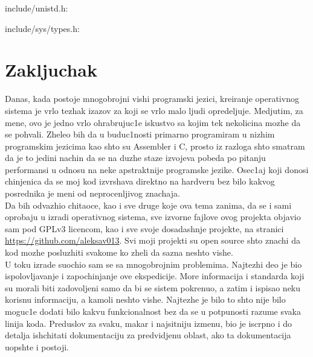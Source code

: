 \documentclass[a4paper,fleqn,12pt]{JMThesis}
\newcommand\eng{\fontencoding{OT1}\fontfamily{\rmdefault}\selectfont}
\newcommand\srb{\fontencoding{OT2}\fontfamily{\rmdefault}\selectfont}
\begin{document}
{\eng include/unistd.h}:

\medskip\begin{minipage}{\textwidth}\eng\srb\end{minipage}\smallskip

{\eng include/sys/types.h}:

\medskip\begin{minipage}{\textwidth}\eng\srb\end{minipage}\smallskip



\chapter{Zakljuchak}

Danas, kada postoje mnogobrojni vishi programski jezici, kreiranje operativnog
sistema je vrlo tezhak izazov za koji se vrlo malo ljudi opredeljuje. Medjutim,
za mene, ovo je jedno vrlo ohrabrujuc1e iskustvo sa kojim tek nekolicina mozhe
da se pohvali. Zheleo bih da u buduc1nosti primarno programiram u nizhim
programskim jezicima kao shto su {\eng Assembler} i {\eng C}, prosto iz razloga
shto smatram da je to jedini nachin da se na duzhe staze izvojeva pobeda po
pitanju performansi u odnosu na neke apstraktnije programske jezike. Osec1aj
koji donosi chinjenica da se moj kod izvrshava direktno na hardveru bez bilo
kakvog posrednika je meni od neprocenljivog znachaja.\\

Da bih odvazhio chitaoce, kao i sve druge koje ova tema zanima, da se i sami
oprobaju u izradi operativnog sistema, sve izvorne fajlove ovog projekta
objavio sam pod {\eng GPLv3} licencom, kao i sve svoje dosadashnje projekte, na
stranici {\eng\url{https://github.com/aleksav013}}. Svi moji projekti su {\eng
open source} shto znachi da kod mozhe posluzhiti svakome ko zheli da sazna
neshto vishe.\\

U toku izrade suochio sam se sa mnogobrojnim problemima. Najtezhi deo je bio
ispolovljavanje i zapochinjanje ove ekspedicije. More informacija i standarda
koji su morali biti zadovoljeni samo da bi se sistem pokrenuo, a zatim i
ispisao neku korisnu informaciju, a kamoli neshto vishe. Najtezhe je bilo to
shto nije bilo moguc1e dodati bilo kakvu funkcionalnost bez da se u potpunosti
razume svaka linija koda. Preduslov za svaku, makar i najsitniju izmenu, bio je
iscrpno i do detalja ish\/chitati dokumentaciju za predvidjenu oblast, ako ta
dokumentacija uopshte i postoji.\\
\end{document}
